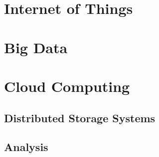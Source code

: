 \section{Internet of Things}

\section{Big Data}

\section{Cloud Computing}
\subsection{Distributed Storage Systems}


\subsection{Analysis}


\section{}